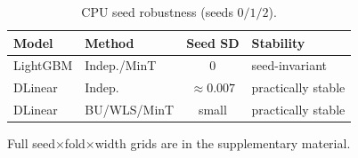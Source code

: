 \begin{table}[width=\columnwidth,pos=t]
\centering
\caption{CPU seed robustness (seeds $0/1/2$).}
\label{tab:seeds}
\begin{threeparttable}
\small
\begin{tabularx}{\tblwidth}{@{}llc>{\raggedright\arraybackslash}X@{}}
\toprule
Model & Method & Seed SD & Stability \\
\midrule
LightGBM & Indep./MinT & $0$ & seed-invariant \\
DLinear & Indep. & $\approx 0.007$ & practically stable \\
DLinear & BU/WLS/MinT & small & practically stable \\
\bottomrule
\end{tabularx}
\begin{tablenotes}
\footnotesize
\item Full seed$\times$fold$\times$width grids are in the supplementary material.
\end{tablenotes}
\end{threeparttable}
\end{table}
